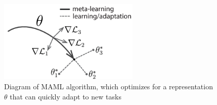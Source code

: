 \begin{figure}[tb]
    \centering
    \includegraphics[width=0.6\textwidth]{figures/images/maml_weights.png}
    \caption{Diagram of MAML algorithm, which optimizes for a representation $\theta$ that can quickly adapt to new tasks}
    \label{fig:maml_weights}
\end{figure}
